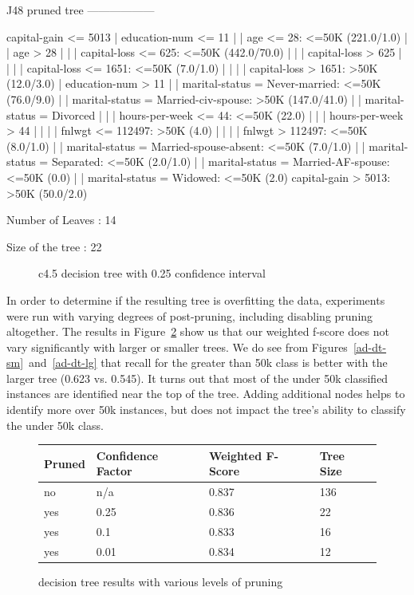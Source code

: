\documentclass{sig-alternate}
\begin{document}
\begin{verbbox}


J48 pruned tree
------------------

capital-gain <= 5013
|   education-num <= 11
|   |   age <= 28:  <=50K (221.0/1.0)
|   |   age > 28
|   |   |   capital-loss <= 625:  <=50K (442.0/70.0)
|   |   |   capital-loss > 625
|   |   |   |   capital-loss <= 1651:  <=50K (7.0/1.0)
|   |   |   |   capital-loss > 1651:  >50K (12.0/3.0)
|   education-num > 11
|   |   marital-status =  Never-married:  <=50K (76.0/9.0)
|   |   marital-status =  Married-civ-spouse:  >50K (147.0/41.0)
|   |   marital-status =  Divorced
|   |   |   hours-per-week <= 44:  <=50K (22.0)
|   |   |   hours-per-week > 44
|   |   |   |   fnlwgt <= 112497:  >50K (4.0)
|   |   |   |   fnlwgt > 112497:  <=50K (8.0/1.0)
|   |   marital-status =  Married-spouse-absent:  <=50K (7.0/1.0)
|   |   marital-status =  Separated:  <=50K (2.0/1.0)
|   |   marital-status =  Married-AF-spouse:  <=50K (0.0)
|   |   marital-status =  Widowed:  <=50K (2.0)
capital-gain > 5013:  >50K (50.0/2.0)

Number of Leaves  :     14

Size of the tree :  22

\end{verbbox}

\begin{figure}[!htbp]
    \centering
    \theverbbox
    \caption{c4.5 decision tree with 0.25 confidence interval \label{ad-dt-c025}}
\end{figure}


In order to determine if the resulting tree is overfitting the data, experiments were run with varying degrees of post-pruning, including disabling pruning altogether. The results in Figure~\ref{ad-dt-pr} show us that our weighted f-score does not vary significantly with larger or smaller trees. We do see from Figures~\ref{ad-dt-sm}~and~\ref{ad-dt-lg} that recall for the greater than 50k class is better with the larger tree (0.623 vs. 0.545). It turns out that most of the under 50k classified instances are identified near the top of the tree. Adding additional nodes helps to identify more over 50k instances, but does not impact the tree's ability to classify the under 50k class.



\begin{figure}[!htbp]
    \centering
    \small
    \begin{tabular}{ | l | l | l | l | }
        \hline
        Pruned & Confidence Factor & Weighted F-Score & Tree Size\\ \hline
        no & n/a & 0.837 & 136\\ \hline
        yes & 0.25 & 0.836 & 22\\ \hline
        yes & 0.1 & 0.833 & 16\\ \hline
        yes & 0.01 & 0.834 & 12\\ \hline
    \end{tabular}
    \normalsize
    \caption{decision tree results with various levels of pruning \label{ad-dt-pr}}
\end{figure}
\end{document}
